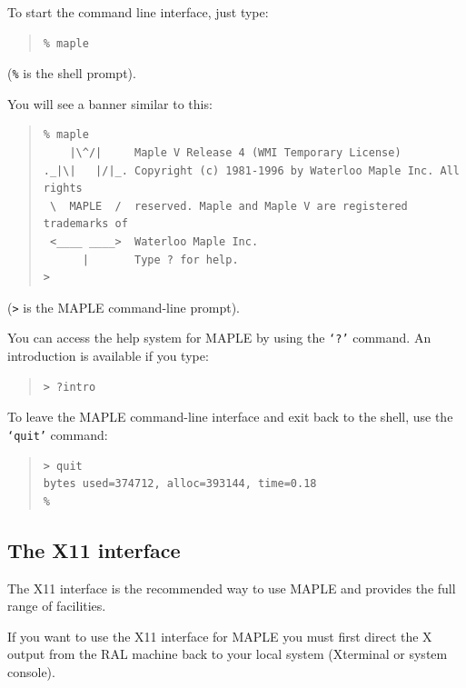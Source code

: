 \documentclass[twoside,11pt]{article}
\newcommand{\xlabel}[1]{}
\begin{document}
To start the command line interface, just type:

\begin{quote}\begin{verbatim}
% maple
\end{verbatim}\end{quote}

(\texttt{\%} is the shell prompt).

You will see a banner similar to this:

\begin{quote}\begin{verbatim}
% maple
    |\^/|     Maple V Release 4 (WMI Temporary License)
._|\|   |/|_. Copyright (c) 1981-1996 by Waterloo Maple Inc. All rights
 \  MAPLE  /  reserved. Maple and Maple V are registered trademarks of
 <____ ____>  Waterloo Maple Inc.
      |       Type ? for help.
>
\end{verbatim}\end{quote}
 
(\verb+>+ is the MAPLE command-line prompt).

You can access the help system for MAPLE by using the \texttt{`?'} command.
An introduction is available if you type:

\begin{quote}\begin{verbatim}
> ?intro
\end{verbatim}\end{quote}

To leave the MAPLE command-line interface and exit back to the shell,
use the \texttt{`quit'} command:

\begin{quote}\begin{verbatim}
> quit
bytes used=374712, alloc=393144, time=0.18
%
\end{verbatim}\end{quote}

\subsection{\xlabel{the_X11_interface}The X11 interface}

The X11 interface is the recommended way to use MAPLE and provides the full
range of facilities.

If you want to use the X11 interface for MAPLE you must first direct
the X output from the RAL machine back to your local system (Xterminal or
system console).
\end{document}
